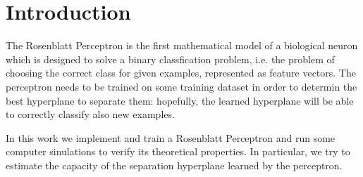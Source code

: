 \section{Introduction}
\label{sec:introduction}

The Rosenblatt Perceptron \cite{rosenblatt1958perceptron} is the first mathematical model of a biological neuron which is designed to solve a binary classfication problem, i.e. the problem of choosing the correct class for given examples, represented as feature vectors.
The perceptron needs to be trained on some training dataset in order to determin the best hyperplane to separate them:
hopefully, the learned hyperplane will be able to correctly classify also new examples.

In this work we implement and train a Rosenblatt Perceptron and run some computer sinulations to verify its theoretical properties.
In particular, we try to estimate the capacity of the separation hyperplane learned by the perceptron.
